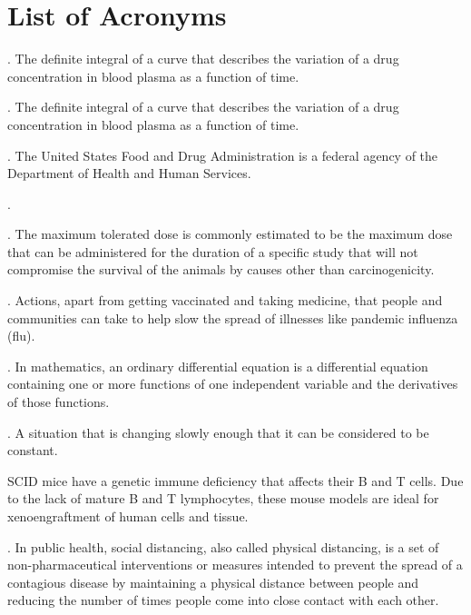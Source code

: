 \chapter*{List of Acronyms}

\begin{acronym}
	.
	The definite integral of a curve that describes the variation of a drug concentration in blood plasma as a function of time.
	
	.
	The definite integral of a curve that describes the variation of a drug concentration in blood plasma as a function of time.
	
	.
	The United States Food and Drug Administration is a federal agency of the Department of Health and Human Services.
	
	.
	
	.
	The maximum tolerated dose is commonly estimated to be the maximum dose that can be administered for the duration of a specific study that will not compromise the survival of the animals by causes other than carcinogenicity.
	
	.
	Actions, apart from getting vaccinated and taking medicine, that people and communities can take to help slow the spread of illnesses like pandemic influenza (flu).
	
	.
	In mathematics, an ordinary differential equation is a differential equation containing one or more functions of one independent variable and the derivatives of those functions.
	
	.
	A situation that is changing slowly enough that it can be considered to be constant.
	
	SCID mice have a genetic immune deficiency that affects their B and T cells. Due to the lack of mature B and T lymphocytes, these mouse models are ideal for xenoengraftment of human cells and tissue.
	
	.
	In public health, social distancing, also called physical distancing, is a set of non-pharmaceutical interventions or measures intended to prevent the spread of a contagious disease by maintaining a physical distance between people and reducing the number of times people come into close contact with each other.
	
	
\end{acronym}

